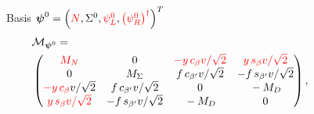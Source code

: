 \documentclass[%
xcolor=dvipsnames,table%
]{beamer}
\begin{document}
\begin{frame}
  \begin{columns}
    \begin{column}{0.47\textwidth}
Basis $\boldsymbol{\psi}^0=\left({\color{red}N},\Sigma^0,{\color{red}\psi_L^0},{\color{red}\left( \psi_R^0 \right)^{\dagger}}\right)^T$ 
\tiny
\begin{align*}
  &\mathcal{M}_{\boldsymbol{\psi}^0}=\nonumber\\
&\begin{pmatrix}
{\color{red}M_N}          &   0       &{\color{red}-y\,c_\beta v/\sqrt{2}}&{\color{red}y\,s_\beta v/\sqrt{2}} \\
0 & M_\Sigma &  f\,c_{\beta'}v/\sqrt{2} & -f\,s_{\beta'}v/\sqrt{2}\\
{\color{red}-y\,c_\beta} v/\sqrt{2} &  f\,c_{\beta'}v/\sqrt{2}  & 0            & {\color{red}}-M_D\\
{\color{red}y\,s_\beta v/\sqrt{2}}& -f\,s_{\beta'}v/\sqrt{2}&{\color{red}}  -M_D                &  0  \\
\end{pmatrix},
\end{align*}
    \end{column}
    \begin{column}{0.53\textwidth}
\end{column}
\end{columns}
\end{frame}
\end{document}
